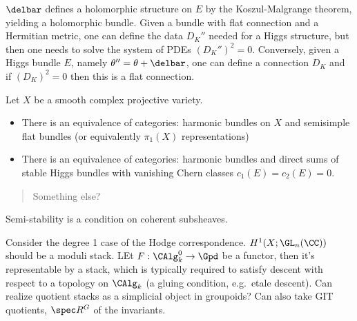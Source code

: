 \begin{remark}

\(\delbar\) defines a holomorphic structure on \(E\) by the
Koszul-Malgrange theorem, yielding a holomorphic bundle. Given a bundle
with flat connection and a Hermitian metric, one can define the data
\(D_K''\) needed for a Higgs structure, but then one needs to solve the
system of PDEs \((D_K'')^2=0\). Conversely, given a Higgs bundle \(E\),
namely \(\theta'' = \theta + \delbar\), one can define a connection
\(D_K\) and if \((D_K)^2=0\) then this is a flat connection.

\end{remark}

\begin{theorem}

Let \(X\) be a smooth complex projective variety.

\begin{itemize}
\tightlist
\item
  There is an equivalence of categories: harmonic bundles on \(X\) and
  semisimple flat bundles (or equivalently \(\pi_1(X)\) representations)
\item
  There is an equivalence of categories: harmonic bundles and direct
  sums of stable Higgs bundles with vanishing Chern classes
  \(c_1(E) = c_2(E) = 0\).
\end{itemize}

\begin{quote}
Something else?
\end{quote}

\end{theorem}

\begin{remark}

Semi-stability is a condition on coherent subsheaves.

\end{remark}

\begin{remark}

Consider the degree 1 case of the Hodge correspondence.
\(H^1(X; \GL_n(\CC))\) should be a moduli stack. LEt
\(F: \CAlg_k^0 \to \Gpd\) be a functor, then it's representable by a
stack, which is typically required to satisfy descent with respect to a
topology on \(\CAlg_k\) (a gluing condition, e.g.~etale descent). Can
realize quotient stacks as a simplicial object in groupoids? Can also
take GIT quotients, \(\spec R^G\) of the invariants.

\end{remark}

